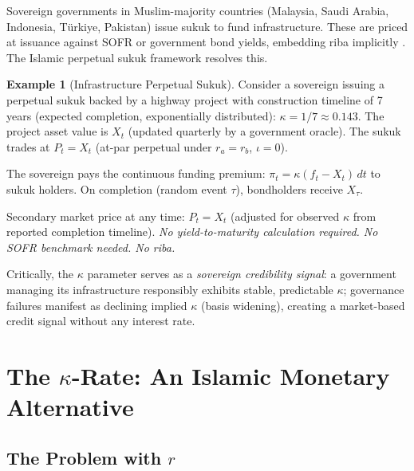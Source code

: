 \documentclass[10pt,twocolumn]{article}
\theoremstyle{plain}
\theoremstyle{definition}
\newtheorem{example}{Example}
\begin{document}
Sovereign governments in Muslim-majority countries (Malaysia,
Saudi Arabia, Indonesia, Türkiye, Pakistan) issue sukuk to fund
infrastructure. These are priced at issuance against SOFR or
government bond yields, embedding riba implicitly
\cite{IIFM2023,IFSB2024}. The Islamic perpetual sukuk framework
resolves this.

\begin{example}[Infrastructure Perpetual Sukuk]
Consider a sovereign issuing a perpetual sukuk backed by a
highway project with construction timeline of 7 years (expected
completion, exponentially distributed): $\kappa = 1/7 \approx
0.143$. The project asset value is $X_t$ (updated quarterly
by a government oracle). The sukuk trades at $P_t = X_t$
(at-par perpetual under $r_a = r_b$, $\iota = 0$).

The sovereign pays the continuous funding premium:
$\pi_t = \kappa(f_t - X_t)\,dt$ to sukuk holders.
On completion (random event $\tau$), bondholders receive $X_\tau$.

Secondary market price at any time: $P_t = X_t$ (adjusted
for observed $\kappa$ from reported completion timeline).
\emph{No yield-to-maturity calculation required. No SOFR
benchmark needed. No riba.}
\end{example}

Critically, the $\kappa$ parameter serves as a \textit{sovereign
credibility signal}: a government managing its infrastructure
responsibly exhibits stable, predictable $\kappa$; governance
failures manifest as declining implied $\kappa$ (basis widening),
creating a market-based credit signal without any interest rate.

\section{The $\kappa$-Rate: An Islamic Monetary Alternative}
\label{sec:kappa_rate}

\subsection{The Problem with $r$}
\end{document}
